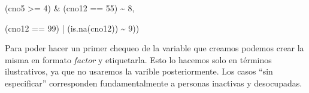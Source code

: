 \documentclass[
]{book}
\newenvironment{Shaded}{\begin{snugshade}}{\end{snugshade}}
\newcommand{\AttributeTok}[1]{\textcolor[rgb]{0.77,0.63,0.00}{#1}}
\newcommand{\DecValTok}[1]{\textcolor[rgb]{0.00,0.00,0.81}{#1}}
\newcommand{\FunctionTok}[1]{\textcolor[rgb]{0.00,0.00,0.00}{#1}}
\newcommand{\NormalTok}[1]{#1}
\newcommand{\OtherTok}[1]{\textcolor[rgb]{0.56,0.35,0.01}{#1}}
\newcommand{\SpecialCharTok}[1]{\textcolor[rgb]{0.00,0.00,0.00}{#1}}
\newcommand{\StringTok}[1]{\textcolor[rgb]{0.31,0.60,0.02}{#1}}
\begin{document}
\begin{Shaded}
\begin{Highlighting}[]
\NormalTok{                        (cno5 }\SpecialCharTok{\textgreater{}=} \DecValTok{4}\NormalTok{) }\SpecialCharTok{\&}\NormalTok{ (cno12 }\SpecialCharTok{==} \DecValTok{55}\NormalTok{) }\SpecialCharTok{\textasciitilde{}} \DecValTok{8}\NormalTok{,}
                        
\NormalTok{                        (cno12 }\SpecialCharTok{==} \DecValTok{99}\NormalTok{) }\SpecialCharTok{|}\NormalTok{ (}\FunctionTok{is.na}\NormalTok{(cno12)) }\SpecialCharTok{\textasciitilde{}} \DecValTok{9}\NormalTok{))}
\end{Highlighting}
\end{Shaded}

Para poder hacer un primer chequeo de la variable que creamos podemos crear la misma en formato \emph{factor} y etiquetarla. Esto lo hacemos solo en términos ilustrativos, ya que no usaremos la varible posteriormente. Los casos ``sin especificar'' corresponden fundamentalmente a personas inactivas y desocupadas.

\begin{Shaded}
\end{Shaded}
\end{document}
